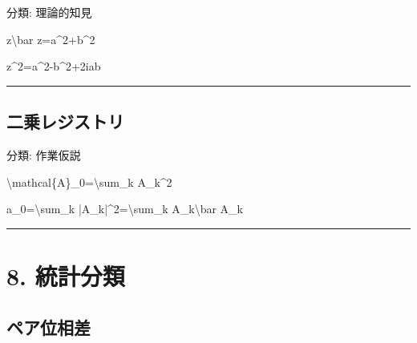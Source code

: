 \documentclass[
  a4paper]{ltjsarticle}
\newenvironment{Shaded}{}{}
\newcommand{\NormalTok}[1]{#1}
\begin{document}
分類: 理論的知見

\begin{Shaded}
\begin{Highlighting}[]
\NormalTok{z\textbackslash{}bar z=a\^{}2+b\^{}2}
\end{Highlighting}
\end{Shaded}

\begin{Shaded}
\begin{Highlighting}[]
\NormalTok{z\^{}2=a\^{}2{-}b\^{}2+2iab}
\end{Highlighting}
\end{Shaded}

\begin{center}\rule{0.5\linewidth}{0.5pt}\end{center}

\subsection{二乗レジストリ}\label{ux4e8cux4e57ux30ecux30b8ux30b9ux30c8ux30ea}

分類: 作業仮説

\begin{Shaded}
\begin{Highlighting}[]
\NormalTok{\textbackslash{}mathcal\{A\}\_0=\textbackslash{}sum\_k A\_k\^{}2}
\end{Highlighting}
\end{Shaded}

\begin{Shaded}
\begin{Highlighting}[]
\NormalTok{a\_0=\textbackslash{}sum\_k |A\_k|\^{}2=\textbackslash{}sum\_k A\_k\textbackslash{}bar A\_k}
\end{Highlighting}
\end{Shaded}

\begin{center}\rule{0.5\linewidth}{0.5pt}\end{center}

\section{8. 統計分類}\label{ux7d71ux8a08ux5206ux985e}

\subsection{ペア位相差}\label{ux30daux30a2ux4f4dux76f8ux5dee}
\end{document}
